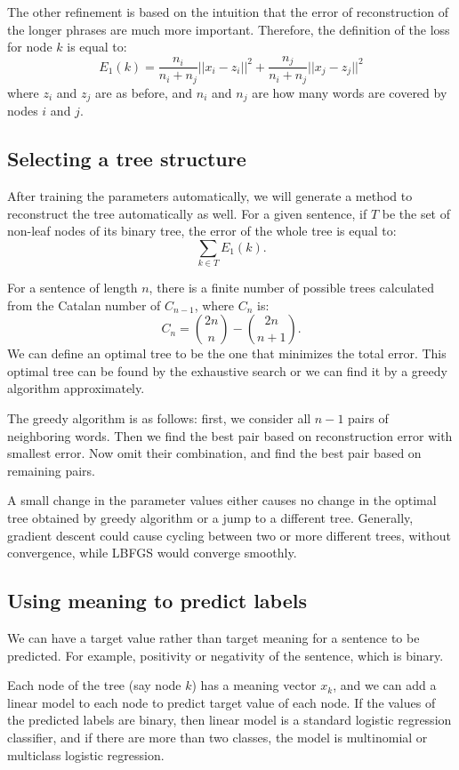 \documentclass[twoside,12pt]{article}
\begin{document}
The other refinement is based on the intuition that the error of reconstruction of the longer phrases are much more important. Therefore, the definition of the loss for node $k$ is equal to:
\begin{equation}
E_1(k)=\frac{n_i}{n_i+n_j}||x_i-z_i||^2+\frac{n_j}{n_i+n_j}||x_j-z_j||^2
\end{equation}
where $z_i$ and $z_j$ are as before, and $n_i$ and $n_j$ are how many words are covered by nodes $i$ and $j$.
\subsection{ Selecting a tree structure}
After training the parameters automatically, we will generate a method to reconstruct the tree automatically as well. For a given sentence, if $T$ be the set of non-leaf nodes of its binary tree, the error of the whole tree is equal to:
\begin{equation}
\sum_{k \in T}E_1(k).
\end{equation}

For a sentence of length $n$, there is a finite number of possible trees calculated from the Catalan number of $C_{n-1}$, where $C_n$ is:
\begin{equation}
C_n= {2n \choose n} -{ 2n\choose n+1}.
\end{equation}
We can define an optimal tree to be the one that minimizes the total error. This optimal tree can be found by the exhaustive search or we can find it by a greedy algorithm approximately. 

The greedy algorithm is as follows: first, we consider all $n-1$ pairs of neighboring words. Then we find the best pair based on reconstruction error with smallest error. Now omit their combination, and find the best pair based on remaining pairs. 

A small change in the parameter values either causes no change in the optimal tree obtained by greedy algorithm or a jump to a different tree. Generally, gradient descent could cause cycling between two or more different trees, without convergence, while LBFGS would converge smoothly. 
\subsection{Using meaning to predict labels}
We can have a target value rather than target meaning for a sentence to be predicted. For example, positivity or negativity of the sentence, which is binary. 

Each node of the tree (say node $k$) has a meaning vector $x_k$, and we can add a linear model to each node to predict target value of each node. If the values of the predicted labels are binary, then linear model is a standard logistic regression classifier, and if there are more than two classes, the model is multinomial or multiclass logistic regression.
\end{document}

